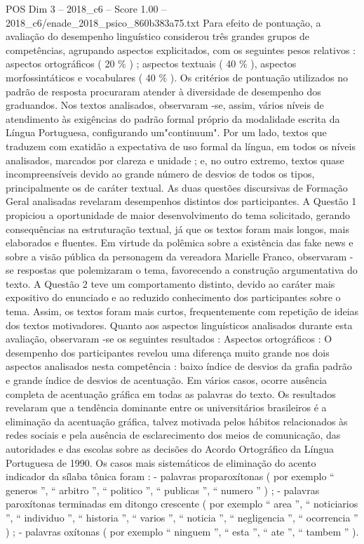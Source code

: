 \begin{textsample}{POS Dim 3 – 2018\_c6 – Score 1.00 – 2018\_c6/enade\_2018\_psico\_860b383a75.txt}
Para efeito de pontuação, a avaliação do desempenho linguístico considerou três grandes grupos de competências, agrupando aspectos explicitados, com os seguintes pesos relativos : aspectos ortográficos ( 20 \% ) ; aspectos textuais ( 40 \% ), aspectos morfossintáticos e vocabulares ( 40 \% ).
Os critérios de pontuação utilizados no padrão de resposta procuraram atender à diversidade de desempenho dos graduandos.
Nos textos analisados, observaram -se, assim, vários níveis de atendimento às exigências do padrão formal próprio da modalidade escrita da Língua Portuguesa, configurando um"continuum".
Por um lado, textos que traduzem com exatidão a expectativa de uso formal da língua, em todos os níveis analisados, marcados por clareza e unidade ; e, no outro extremo, textos quase incompreensíveis devido ao grande número de desvios de todos os tipos, principalmente os de caráter textual.
As duas questões discursivas de Formação Geral analisadas revelaram desempenhos distintos dos participantes.
A Questão 1 propiciou a oportunidade de maior desenvolvimento do tema solicitado, gerando consequências na estruturação textual, já que os textos foram mais longos, mais elaborados e fluentes.
Em virtude da polêmica sobre a existência das fake news e sobre a visão pública da personagem da vereadora Marielle Franco, observaram -se respostas que polemizaram o tema, favorecendo a construção argumentativa do texto.
A Questão 2 teve um comportamento distinto, devido ao caráter mais expositivo do enunciado e ao reduzido conhecimento dos participantes sobre o tema.
Assim, os textos foram mais curtos, frequentemente com repetição de ideias dos textos motivadores.
Quanto aos aspectos linguísticos analisados durante esta avaliação, observaram -se os seguintes resultados : Aspectos ortográficos : O desempenho dos participantes revelou uma diferença muito grande nos dois aspectos analisados nesta competência : baixo índice de desvios da grafia padrão e grande índice de desvios de acentuação.
Em vários casos, ocorre ausência completa de acentuação gráfica em todas as palavras do texto.
Os resultados revelaram que a tendência dominante entre os universitários brasileiros é a eliminação da acentuação gráfica, talvez motivada pelos hábitos relacionados às redes sociais e pela ausência de esclarecimento dos meios de comunicação, das autoridades e das escolas sobre as decisões do Acordo Ortográfico da Língua Portuguesa de 1990.
Os casos mais sistemáticos de eliminação do acento indicador da sílaba tônica foram : - palavras proparoxítonas ( por exemplo “ generos ”, “ arbitro ”, “ politico ”, “ publicas ”, “ numero ” ) ; - palavras paroxítonas terminadas em ditongo crescente ( por exemplo “ area ”, “ noticiarios ”, “ individuo ”, “ historia ”, “ varios ”, “ noticia ”, “ negligencia ”, “ ocorrencia ” ) ; - palavras oxítonas ( por exemplo “ ninguem ”, “ esta ”, “ ate ”, “ tambem ” ).

\end{textsample}
